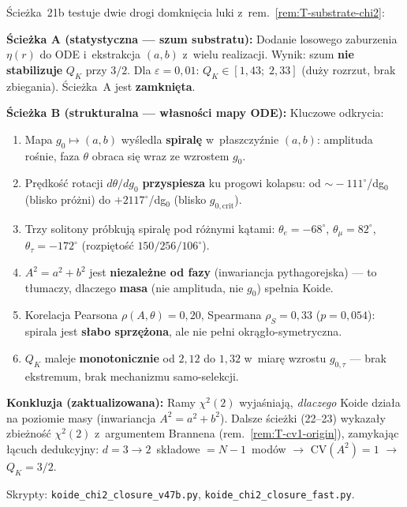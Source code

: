 \begin{remark}%
\label{rem:T-chi2-closure}
\'Scie\.zka~21b testuje dwie drogi domkni\k{e}cia luki
z~rem.~\ref{rem:T-substrate-chi2}:

\medskip\noindent
\textbf{\'Scie\.zka A (statystyczna --- szum substratu):}
Dodanie losowego zaburzenia $\eta(r)$ do ODE
i~ekstrakcja $(a,b)$ z~wielu realizacji.
Wynik: szum \textbf{nie stabilizuje} $Q_K$ przy $3/2$.
Dla $\varepsilon = 0{,}01$: $Q_K \in [1{,}43;\; 2{,}33]$
(du\.zy rozrzut, brak zbiegania).
\'Scie\.zka~A jest \textbf{zamkni\k{e}ta}.

\medskip\noindent
\textbf{\'Scie\.zka B (strukturalna --- w\l{}asno\'sci mapy ODE):}
Kluczowe odkrycia:
\begin{enumerate}[nosep]
  \item Mapa $g_0 \mapsto (a, b)$ wy\'sledla \textbf{spiral\k{e}}
    w~p\l{}aszczy\'znie $(a,b)$: amplituda ro\'snie,
    faza $\theta$ obraca si\k{e} wraz ze wzrostem $g_0$.
  \item Pr\k{e}dko\'s\'c rotacji $d\theta/dg_0$
    \textbf{przyspiesza} ku progowi kolapsu:
    od $\sim\!-111^\circ$/dg$_0$ (blisko pr\'o\.zni)
    do $+2117^\circ$/dg$_0$ (blisko $g_{0,\mathrm{crit}}$).
  \item Trzy solitony pr\'obkuj\k{a} spiral\k{e} pod
    r\'o\.znymi k\k{a}tami:
    $\theta_e = -68^\circ$, $\theta_\mu = 82^\circ$,
    $\theta_\tau = -172^\circ$ (rozpi\k{e}to\'s\'c $150/256/106^\circ$).
  \item $A^2 = a^2 + b^2$ jest \textbf{niezale\.zne od fazy}
    (inwariancja pythagorejska) --- to t\l{}umaczy,
    dlaczego \textbf{masa} (nie amplituda, nie $g_0$)
    spe\l{}nia Koide.
  \item Korelacja Pearsona $\rho(A,\theta) = 0{,}20$,
    Spearmana $\rho_S = 0{,}33$ ($p = 0{,}054$):
    spirala jest \textbf{s\l{}abo sprz\k{e}\.zona}, ale
    nie pe\l{}ni okr\k{a}g\l{}o-symetryczna.
  \item $Q_K$ maleje \textbf{monotonicznie} od $2{,}12$ do $1{,}32$
    w~miar\k{e} wzrostu $g_{0,\tau}$
    --- brak ekstremum, brak mechanizmu samo-selekcji.
\end{enumerate}

\medskip\noindent
\textbf{Konkluzja (zaktualizowana):}
Ramy $\chi^2(2)$ wyja\'sniaj\k{a}, \emph{dlaczego}
Koide dzia\l{}a na poziomie masy
(inwariancja $A^2 = a^2 + b^2$).
Dalsze \'scie\.zki (22--23) wykaza\l{}y zbie\.zno\'s\'c
$\chi^2(2)$ z~argumentem Brannena (rem.~\ref{rem:T-cv1-origin}),
zamykaj\k{a}c \l{}\k{a}cuch dedukcyjny:
$d = 3 \to 2$~sk\l{}adowe $= N{-}1$~mod\'ow $\to$
$\mathrm{CV}(A^2) = 1$ $\to$ $Q_K = 3/2$.

Skrypty: \texttt{koide\_chi2\_closure\_v47b.py},
\texttt{koide\_chi2\_closure\_fast.py}.
\end{remark}

